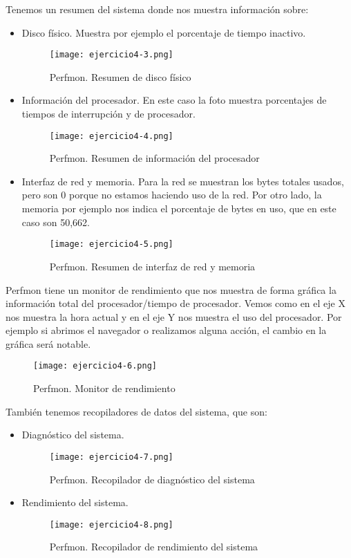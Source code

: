 	Tenemos un resumen del sistema donde nos muestra información sobre:
	\begin{itemize}
		\item Disco físico. Muestra por ejemplo el porcentaje de tiempo inactivo. 
			\begin{figure}[H] 
				\centering
				\texttt{[image: ejercicio4-3.png]} 
				\label{figura2} 
				\caption{Perfmon. Resumen de disco físico}
			\end{figure}	
		\item Información del procesador. En este caso la foto muestra porcentajes de tiempos de interrupción y de procesador.
			\begin{figure}[H] 
				\centering
				\texttt{[image: ejercicio4-4.png]} 
				\label{figura2} 
				\caption{Perfmon. Resumen de información del procesador}
			\end{figure}
		\item Interfaz de red y memoria. Para la red se muestran los bytes totales usados, pero son 0 porque no estamos haciendo uso de la red. Por otro lado, la memoria por ejemplo nos indica el porcentaje de bytes en uso, que en este caso son 50,662.
			\begin{figure}[H] 
				\centering
				\texttt{[image: ejercicio4-5.png]} 
				\label{figura2} 
				\caption{Perfmon. Resumen de interfaz de red y memoria}
			\end{figure}
	\end{itemize}
	
	
	Perfmon tiene un monitor de rendimiento que nos muestra de forma gráfica la información total del procesador/tiempo de procesador. Vemos como en el eje X nos muestra la hora actual y en el eje Y nos muestra el uso del procesador. Por ejemplo si abrimos el navegador o realizamos alguna acción, el cambio en la gráfica será notable.
	\begin{figure}[H] 
		\centering
		\texttt{[image: ejercicio4-6.png]} 
		\label{figura2} 
		\caption{Perfmon. Monitor de rendimiento}
	\end{figure}
	
	También tenemos recopiladores de datos del sistema, que son:
	\begin{itemize}
		\item Diagnóstico del sistema.
			\begin{figure}[H] 
				\centering
				\texttt{[image: ejercicio4-7.png]} 
				\label{figura2} 
				\caption{Perfmon. Recopilador de diagnóstico del sistema}
			\end{figure}
		\item Rendimiento del sistema.
			\begin{figure}[H] 
				\centering
				\texttt{[image: ejercicio4-8.png]} 
				\label{figura2} 
				\caption{Perfmon. Recopilador de rendimiento del sistema}
			\end{figure}
	\end{itemize}
	
